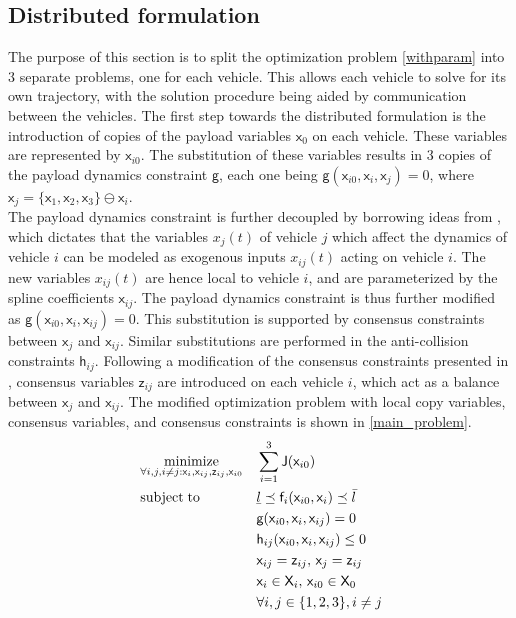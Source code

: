\documentclass[letterpaper, 10 pt, conference]{ieeeconf}
\newcommand{\ubar}[1]{\text{\b{$#1$}}}
\DeclareMathOperator*{\minimize}{minimize}
\DeclareMathOperator*{\subj}{subject\;to}
\newcommand{\cx}{\textsf{x}}
\newcommand{\cz}{\textsf{z}}
\newcommand{\J}{\textsf{J}}
\newcommand{\cf}{\textsf{f}}
\newcommand{\cg}{\textsf{g}}
\newcommand{\ch}{\textsf{h}}
\newcommand{\X}{\textsf{X}}
\begin{document}
 \subsection{Distributed formulation}
 The purpose of this section is to split the optimization problem \eqref{withparam} into 3 separate problems, one for each vehicle. This allows each vehicle to solve for its own trajectory, with the solution procedure being aided by communication between the vehicles. The first step towards the distributed formulation is the introduction of copies of the payload variables $\cx_0$ on each vehicle. These variables are represented by $\cx_{i0}$. The substitution of these variables results in 3 copies of the payload dynamics constraint $\cg$, each one being $\cg(\cx_{i0},\cx_i,\cx_j) = 0$, where $\cx_j = \{\cx_1,\cx_2,\cx_3\}\ominus \cx_i$.
 \\ \indent
 The payload dynamics constraint is further decoupled by borrowing ideas from \cite{c11}, which dictates that the variables $x_{j}(t)$ of vehicle $j$ which affect the dynamics of vehicle $i$ can be modeled as exogenous inputs $x_{ij}(t)$ acting on vehicle $i$. The new variables $x_{ij}(t)$ are hence local to vehicle $i$, and are parameterized by the spline coefficients $\cx_{ij}$. The payload dynamics constraint is thus further modified as $\cg(\cx_{i0},\cx_i,\cx_{ij}) = 0$. This substitution is supported by consensus constraints between  $\cx_{j}$ and $\cx_{ij}$. Similar substitutions are performed in the anti-collision constraints $\ch_{ij}$. Following a modification of the consensus constraints presented in \cite{c16}, consensus variables $\cz_{ij}$ are introduced on each vehicle $i$, which act as a balance between $\cx_{j}$ and $\cx_{ij}$. The modified optimization problem with local copy variables, consensus variables, and consensus constraints is shown in \eqref{main_problem}.
   \begin{equation}
     \label{main_problem}
     \begin{aligned}
       & \minimize_{\forall i,j,i \neq j:\cx_i,\cx_{ij},\cz_{ij},\cx_{i0}} &&  \sum\limits_{i=1}^{3}\J(\cx_{i0}) \\
       & \subj
       && \ubar{l} \preceq \cf_i(\cx_{i0},\cx_i) \preceq \bar{l}\\
       &       && \cg(\cx_{i0},\cx_i,\cx_{ij}) = 0 \\
       &        && \ch_{ij}(\cx_{i0},\cx_i,\cx_{ij}) \leq 0 \\
       &         && \cx_{ij} = \cz_{ij},\, \cx_{j} = \cz_{ij} \\
       &        && \cx_i \in \X_i,\, \cx_{i0} \in \X_0 \\
       &                                && \forall i,j \in \{1,2,3\}, i \neq j
     \end{aligned}
   \end{equation}
\end{document}
